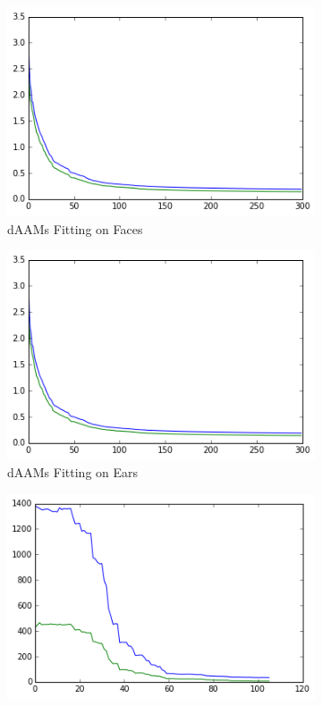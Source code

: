 \begin{figure}[h]
    \centering
    \begin{subfigure}[b]{0.2\textwidth}
            \includegraphics[width=\textwidth]{supports/Model_Analysis/Shape_Reconstruct_ear}
        \caption{dAAMs Fitting on Faces}
    \end{subfigure}
    \qquad
    \begin{subfigure}[b]{0.2\textwidth}
            \includegraphics[width=\textwidth]{supports/Model_Analysis/Shape_Reconstruct_ear_test}
        \caption{dAAMs Fitting on Ears}
    \end{subfigure}
    \begin{subfigure}[b]{0.2\textwidth}
            \includegraphics[width=\textwidth]{supports/Model_Analysis/Shape_Reconstruct_ear_aam}

\end{subfigure}
\end{figure}
